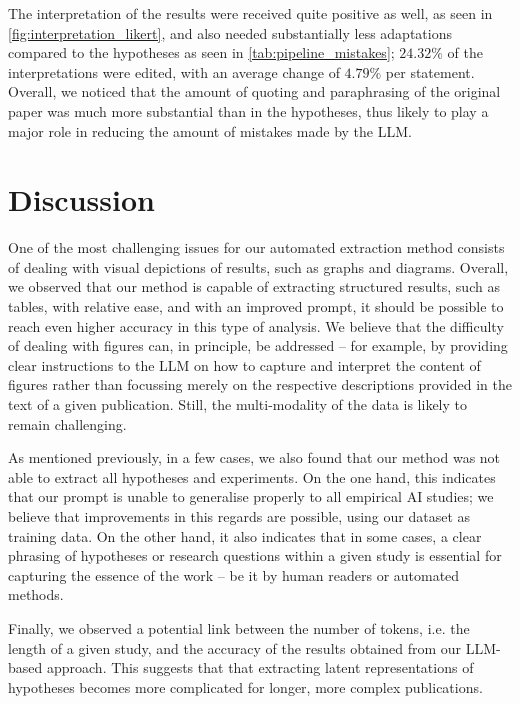 \documentclass[letterpaper]{article} %
\begin{document}
The interpretation of the results were received quite positive as well, as seen in \autoref{fig:interpretation_likert}, and also needed substantially less adaptations compared to the hypotheses as seen in \autoref{tab:pipeline_mistakes}; $24.32\%$ of the interpretations were edited, with an average change of $4.79\%$ per statement. Overall, we noticed that the amount of quoting and paraphrasing of the original paper was much more substantial than in the hypotheses, thus likely to play a major role in reducing the amount of mistakes made by the LLM. 

\section{Discussion}


One of the most challenging issues for our automated extraction method consists of dealing with visual depictions of results, such as graphs and diagrams.
Overall, we observed that our method is capable of extracting structured results, such as tables, with relative ease, and with an improved prompt, it should be possible to reach even higher accuracy in this type of analysis. We believe that the difficulty of dealing with figures can, in principle, be addressed -- for example, by providing clear instructions to the LLM on how to capture and interpret the content of figures rather than focussing merely on the respective descriptions provided in the text of a given publication. 
Still, the multi-modality of the data is likely to remain challenging.

As mentioned previously, in a few cases, we also found that our method was not able to extract all hypotheses and experiments.
On the one hand, this indicates that our prompt is unable to generalise properly to all empirical AI studies; we believe that improvements in this regards are possible, using our dataset as training data. On the other hand, it also indicates that in some cases, a clear phrasing of hypotheses or research questions within a given study is essential for capturing the essence of the work -- be it by human readers or automated methods. 

Finally, we observed a potential link between the number of tokens, i.e.{} the length of a given study, and the accuracy of the results obtained from our LLM-based approach. This suggests that that extracting latent representations of hypotheses becomes more complicated for longer, more complex publications.
\end{document}
